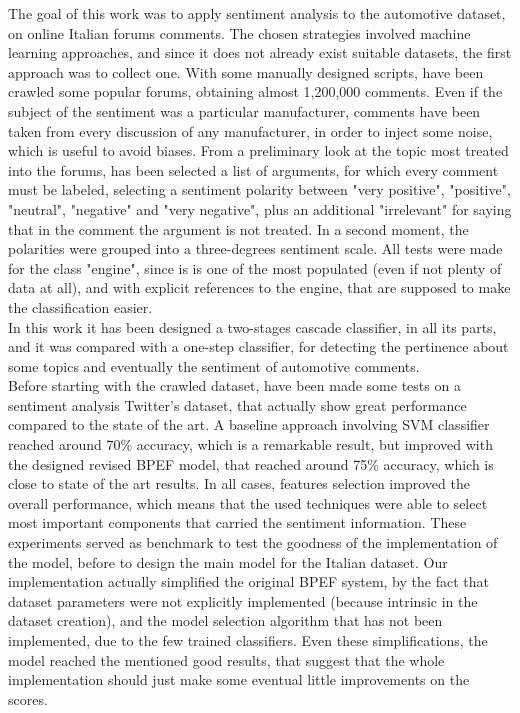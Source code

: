 The goal of this work was to apply sentiment analysis to the automotive dataset, on online Italian forums comments. The chosen strategies involved machine learning approaches, and since it does not already exist suitable datasets, the first approach was to collect one. With some manually designed scripts, have been crawled some popular forums, obtaining almost 1,200,000 comments. Even if the subject of the sentiment was a particular manufacturer, comments have been taken from every discussion of any manufacturer, in order to inject some noise, which is useful to avoid biases. From a preliminary look at the topic most treated into the forums, has been selected a list of arguments, for which every comment must be labeled, selecting a sentiment polarity between "very positive", "positive", "neutral", "negative" and "very negative", plus an additional "irrelevant" for saying that in the comment the argument is not treated. In a second moment, the polarities were grouped into a three-degrees sentiment scale. All tests were made for the class "engine", since is is one of the most populated (even if not plenty of data at all), and with explicit references to the engine, that are supposed to make the classification easier.\\
In this work it has been designed a two-stages cascade classifier, in all its parts, and it was compared with a one-step classifier, for detecting the pertinence about some topics and eventually the sentiment of automotive comments.\\
Before starting with the crawled dataset, have been made some tests on a sentiment analysis Twitter's dataset, that actually show great performance compared to the state of the art. A baseline approach involving \acl{SVM} classifier reached around 70\% accuracy, which is a remarkable result, but improved with the designed revised \acl{BPEF} model, that reached around 75\% accuracy, which is close to state of the art results. In all cases, features selection improved the overall performance, which means that the used techniques were able to select most important components that carried the sentiment information. These experiments served as benchmark to test the goodness of the implementation of the model, before to design the main model for the Italian dataset. Our implementation actually simplified the original \ac{BPEF} system, by the fact that dataset parameters were not explicitly implemented (because intrinsic in the dataset creation), and the model selection algorithm that has not been implemented, due to the few trained classifiers. Even these simplifications, the model reached the mentioned good results, that suggest that the whole implementation should just make some eventual little improvements on the scores.\\
